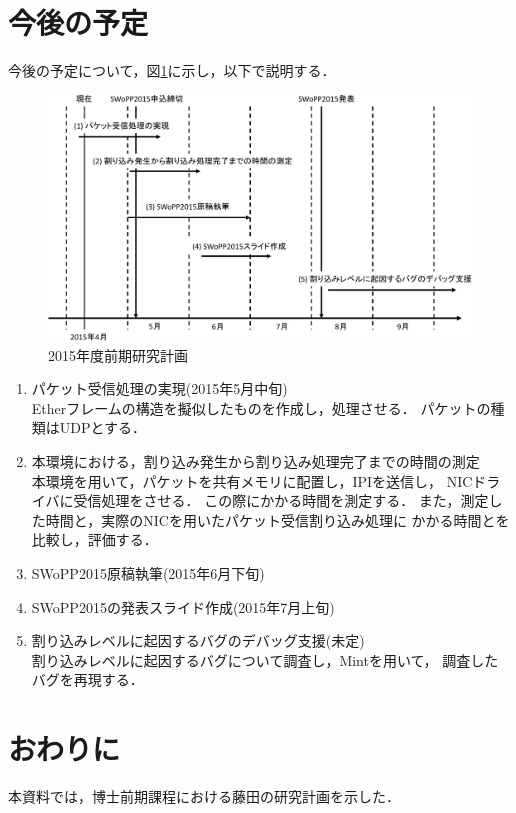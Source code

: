 \documentclass[12pt]{jsarticle}
\newcommand{\insertfigurecontents}[5][1]{
  \texttt{[image: \\figdir/\#3.\\figext]}
  \caption{#4}\ecaption{#5}\label{#2}
}
\newcommand{\insertwidefigure}[5][0.9]{
  \begin{figure}[tb]
    \begin{center}
      \insertfigurecontents[#1]{#2}{#3}{#4}{#5}
    \end{center}
  \end{figure}
}
\begin{document}
\section{今後の予定}
今後の予定について，図\ref{fig:plan}に示し，以下で説明する．
\begin{figure}[t]
    \begin{center}
    \includegraphics[clip,scale=0.65]{fig/fig1.pdf}
    \caption{2015年度前期研究計画}
    \label{fig:plan}
\end{center}
\end{figure}
\begin{enumerate}
    \item パケット受信処理の実現(2015年5月中旬)\\
        Etherフレームの構造を擬似したものを作成し，処理させる．
        パケットの種類はUDPとする．
    \item 本環境における，割り込み発生から割り込み処理完了までの時間の測定\\
        本環境を用いて，パケットを共有メモリに配置し，IPIを送信し，
        NICドライバに受信処理をさせる．
        この際にかかる時間を測定する．
        また，測定した時間と，実際のNICを用いたパケット受信割り込み処理に
        かかる時間とを比較し，評価する．
    \item SWoPP2015原稿執筆(2015年6月下旬)
    \item SWoPP2015の発表スライド作成(2015年7月上旬)
    \item 割り込みレベルに起因するバグのデバッグ支援(未定)\\
        割り込みレベルに起因するバグについて調査し，Mintを用いて，
        調査したバグを再現する．
\end{enumerate}
\section{おわりに}
本資料では，博士前期課程における藤田の研究計画を示した．
\end{document}
